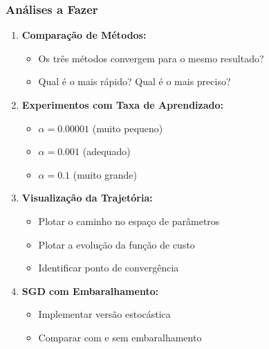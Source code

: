 \documentclass[xcolor=dvipsnames,t,aspectratio=169]{beamer} %
\begin{document}
\begin{frame}
    \frametitle{Análises a Fazer}
    
    \begin{enumerate}
        \item \textbf{Comparação de Métodos:}
        \begin{itemize}
            \item Os três métodos convergem para o mesmo resultado?
            \item Qual é o mais rápido? Qual é o mais preciso?
        \end{itemize}
        
        \item \textbf{Experimentos com Taxa de Aprendizado:}
        \begin{itemize}
            \item $\alpha = 0.00001$ (muito pequeno)
            \item $\alpha = 0.001$ (adequado)
            \item $\alpha = 0.1$ (muito grande)
        \end{itemize}
        
        \item \textbf{Visualização da Trajetória:}
        \begin{itemize}
            \item Plotar o caminho no espaço de parâmetros
            \item Plotar a evolução da função de custo
            \item Identificar ponto de convergência
        \end{itemize}
        
        \item \textbf{SGD com Embaralhamento:}
        \begin{itemize}
            \item Implementar versão estocástica
            \item Comparar com e sem embaralhamento
        \end{itemize}
    \end{enumerate}
\end{frame}
\end{document}
